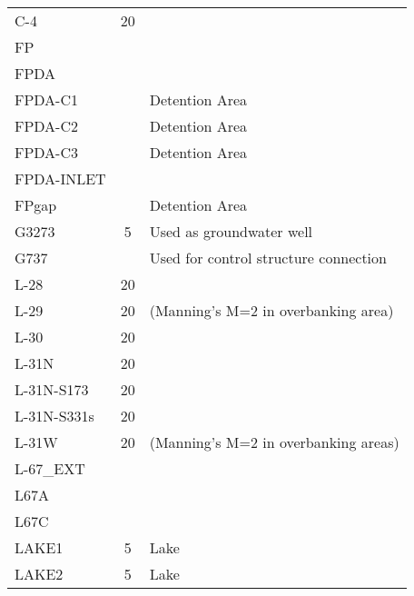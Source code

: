 \begin{table}[!h]
\begin{tabular}{lcl}
C-4                & 20           &                                             \\
FP                 &              &                                             \\
FPDA               &              &                                             \\
FPDA-C1            &              & Detention Area                              \\
FPDA-C2            &              & Detention Area                              \\
FPDA-C3            &              & Detention Area                              \\
FPDA-INLET         &              &                                             \\
FPgap              &              & Detention Area                              \\
G3273              & 5            & Used as groundwater well                    \\
G737               &              & Used for control structure connection       \\
L-28               & 20           &                                             \\
L-29               & 20           & (Manning's M=2 in overbanking area)         \\
L-30               & 20           &                                             \\
L-31N              & 20           &                                             \\
L-31N-S173         & 20           &                                             \\
L-31N-S331s        & 20           &                                             \\
L-31W              & 20           & (Manning's M=2 in overbanking areas)        \\
L-67\_EXT          &              &                                             \\
L67A               &              &                                             \\
L67C               &              &                                             \\
LAKE1              & 5            & Lake                                        \\
LAKE2              & 5            & Lake                                        \\

\end{tabular}
\end{table}
